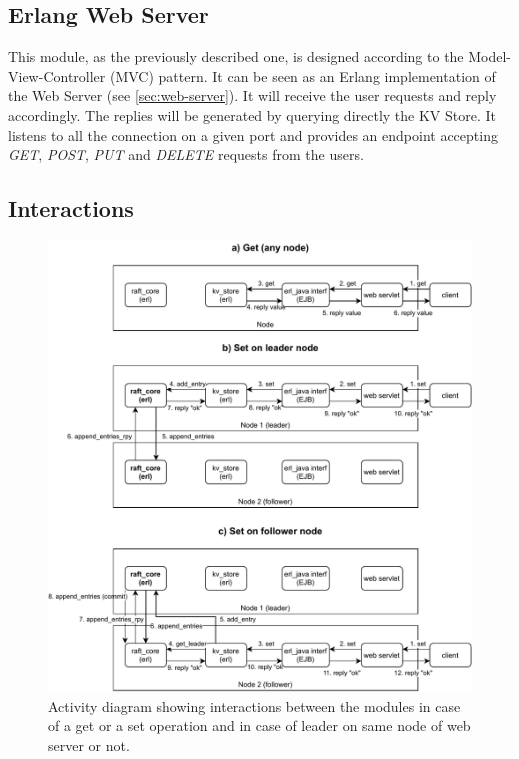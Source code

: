 \documentclass[a4paper]{article}
\begin{document}
\subsection{Erlang Web Server}
\label{sec:cowboy}
This module, as the previously described one, is designed according to the Model-View-Controller (MVC) pattern. It can be seen as an Erlang implementation of the Web Server (see \ref{sec:web-server}).
It will receive the user requests and reply accordingly. The replies will be
generated by querying directly the KV Store.
It listens to all the connection on a given port and provides an endpoint accepting \emph{GET}, \emph{POST}, \emph{PUT} and \emph{DELETE} requests from the users.

\subsection{Interactions}

\begin{figure}
    \includegraphics[width=\textwidth]{raft_operations.pdf}
    \caption{Activity diagram showing interactions between the modules in 
    case of a get or a set operation and in case of leader on same node of 
    web server or not.}
    \label{fig:raft-operations}
\end{figure}
\end{document}
